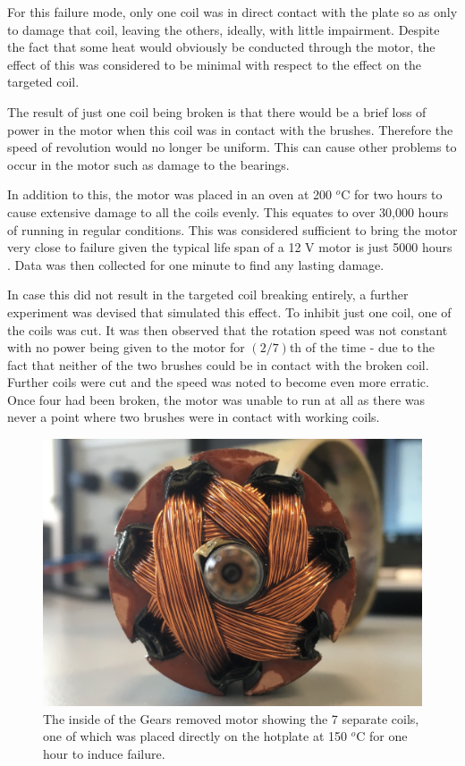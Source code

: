 For this failure mode, only one coil was in direct contact with the plate so as only to damage that coil, leaving the others, ideally, with little impairment. Despite the fact that some heat would obviously be conducted through the motor, the effect of this was considered to be minimal with respect to the effect on the targeted coil.

The result of just one coil being broken is that there would be a brief loss of power in the motor when this coil was in contact with the brushes. Therefore the speed of revolution would no longer be uniform. This can cause other problems to occur in the motor such as damage to the bearings. 

In addition to this, the motor was placed in an oven at 200 $^o$C for two hours to cause extensive damage to all the coils evenly. This equates to over 30,000 hours of running in regular conditions. This was considered sufficient to bring the motor very close to failure given the typical life span of a 12 V motor is just 5000 hours \cite{jones1973selecting}.
Data was then collected for one minute to find any lasting damage.

In case this did not result in the targeted coil breaking entirely, a further experiment was devised that simulated this effect. To inhibit just one coil, one of the coils was cut. It was then observed that the rotation speed was not constant with no power being given to the motor for $({2}/{7})$th of the time - due to the fact that neither of the two brushes could be in contact with the broken coil. Further coils were cut and the speed was noted to become even more erratic. Once four had been broken, the motor was unable to run at all as there was never a point where two brushes were in contact with working coils.

\begin{figure}[t]
    \includegraphics[width=1.0\textwidth]{fig/Gears_Removed_Inside.JPG}
    \caption[Inside Workings of Motor D]{The inside of the Gears removed motor showing the 7 separate coils, one of which was placed directly on the hotplate at 150 $^o$C for one hour to induce failure.}
    \label{fig:hotplate_motor}
\end{figure}


